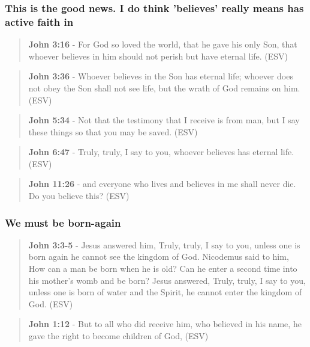 \documentclass[11pt]{article}
\begin{document}
\subsubsection{This is the good news. I do think 'believes' really means has active faith in}
\label{sec:orgae0723f}
\begin{quote}
\textbf{John 3:16} - For God so loved the world, that he gave his only Son, that whoever believes in him should not perish but have eternal life. (ESV)
\end{quote}

\begin{quote}
\textbf{John 3:36} - Whoever believes in the Son has eternal life; whoever does not obey the Son shall not see life, but the wrath of God remains on him. (ESV)
\end{quote}

\begin{quote}
\textbf{John 5:34} - Not that the testimony that I receive is from man, but I say these things so that you may be saved. (ESV)
\end{quote}

\begin{quote}
\textbf{John 6:47} - Truly, truly, I say to you, whoever believes has eternal life. (ESV)
\end{quote}

\begin{quote}
\textbf{John 11:26} - and everyone who lives and believes in me shall never die. Do you believe this? (ESV)
\end{quote}

\subsubsection{We must be born-again}
\label{sec:org159e75e}
\begin{quote}
\textbf{John 3:3-5} - Jesus answered him, Truly, truly, I say to you, unless one is born again he cannot see the kingdom of God.  Nicodemus said to him, How can a man be born when he is old?  Can he enter a second time into his mother's womb and be born?  Jesus answered, Truly, truly, I say to you, unless one is born of water and the Spirit, he cannot enter the kingdom of God. (ESV)
\end{quote}

\begin{quote}
\textbf{John 1:12} - But to all who did receive him, who believed in his name, he gave the right to become children of God, (ESV)
\end{quote}
\end{document}
